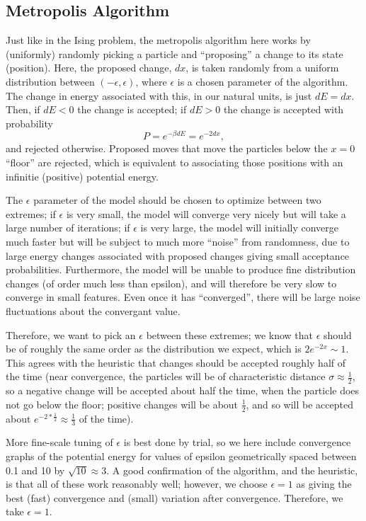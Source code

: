\documentclass{article}
\begin{document}
\subsection{Metropolis Algorithm}
Just like in the Ising problem, the metropolis algorithm here works by (uniformly) randomly picking a particle and ``proposing'' a change to its state (position). Here, the proposed change, $dx$, is taken randomly from a uniform distribution between $(-\epsilon, \epsilon)$, where $\epsilon$ is a chosen parameter of the algorithm. The change in energy associated with this, in our natural units, is just $dE = dx$. Then, if $dE < 0$ the change is accepted; if $dE > 0$ the change is accepted with probability
$$P = e^{-\beta dE} = e^{-2dx},$$
and rejected otherwise. Proposed moves that move the particles below the $x=0$ ``floor'' are rejected, which is equivalent to associating those positions with an infinitie (positive) potential energy.

The $\epsilon$ parameter of the model should be chosen to optimize between two extremes; if $\epsilon$ is very small, the model will converge very nicely but will take a large number of iterations; if $\epsilon$ is very large, the model will initially converge much faster but will be subject to much more ``noise'' from randomness, due to large energy changes associated with proposed changes giving small acceptance probabilities. Furthermore, the model will be unable to produce fine distribution changes (of order much less than epsilon), and will therefore be very slow to converge in small features. Even once it has ``converged'', there will be large noise fluctuations about the convergant value.

Therefore, we want to pick an $\epsilon$ between these extremes; we know that $\epsilon$ should be of roughly the same order as the distribution we expect, which is $2e^{-2x} \sim 1$. This agrees with the heuristic that changes should be accepted roughly half of the time (near convergence, the particles will be of characteristic distance $\sigma \approx \frac{1}{2}$, so a negative change will be accepted about half the time, when the particle does not go below the floor; positive changes will be about $\frac{1}{2}$, and so will be accepted about $e^{-2*\frac{1}{2}} \approx \frac{1}{3}$ of the time).

More fine-scale tuning of $\epsilon$ is best done by trial, so we here include convergence graphs of the potential energy for values of epsilon geometrically spaced between 0.1 and 10 by $\sqrt{10} \approx 3$. A good confirmation of the algorithm, and the heuristic, is that all of these work reasonably well; however, we choose $\epsilon = 1$ as giving the best (fast) convergence and (small) variation after convergence. Therefore, we take $\epsilon = 1$.
\end{document}
